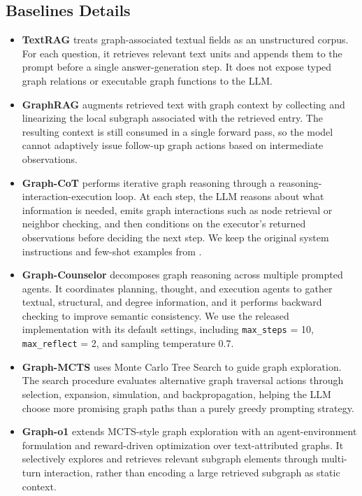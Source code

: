 \documentclass[11pt]{article}
\begin{document}
\subsection{Baselines Details}
\label{app:baselines}
\begin{itemize}[leftmargin=*]
\item \textbf{TextRAG} \cite{gao2023retrieval} treats graph-associated textual fields as an unstructured corpus.
For each question, it retrieves relevant text units and appends them to the prompt before a single answer-generation step.
It does not expose typed graph relations or executable graph functions to the LLM.

\item \textbf{GraphRAG} \cite{ye2024language} augments retrieved text with graph context by collecting and linearizing the local subgraph associated with the retrieved entry.
The resulting context is still consumed in a single forward pass, so the model cannot adaptively issue follow-up graph actions based on intermediate observations.

\item \textbf{Graph-CoT} \cite{jin2024graph} performs iterative graph reasoning through a reasoning-interaction-execution loop.
At each step, the LLM reasons about what information is needed, emits graph interactions such as node retrieval or neighbor checking, and then conditions on the executor's returned observations before deciding the next step.
We keep the original system instructions and few-shot examples from \citet{jin2024graph}.

\item \textbf{Graph-Counselor} \cite{gao2025graph} decomposes graph reasoning across multiple prompted agents.
It coordinates planning, thought, and execution agents to gather textual, structural, and degree information, and it performs backward checking to improve semantic consistency.
We use the released implementation with its default settings, including \texttt{max\_steps} = 10, \texttt{max\_reflect} = 2, and sampling temperature $0.7$.

\item \textbf{Graph-MCTS} \cite{liu2025graphmcts} uses Monte Carlo Tree Search to guide graph exploration.
The search procedure evaluates alternative graph traversal actions through selection, expansion, simulation, and backpropagation, helping the LLM choose more promising graph paths than a purely greedy prompting strategy.

\item \textbf{Graph-o1} \cite{liu2025grapho1} extends MCTS-style graph exploration with an agent-environment formulation and reward-driven optimization over text-attributed graphs.
It selectively explores and retrieves relevant subgraph elements through multi-turn interaction, rather than encoding a large retrieved subgraph as static context.
\end{itemize}
\end{document}
